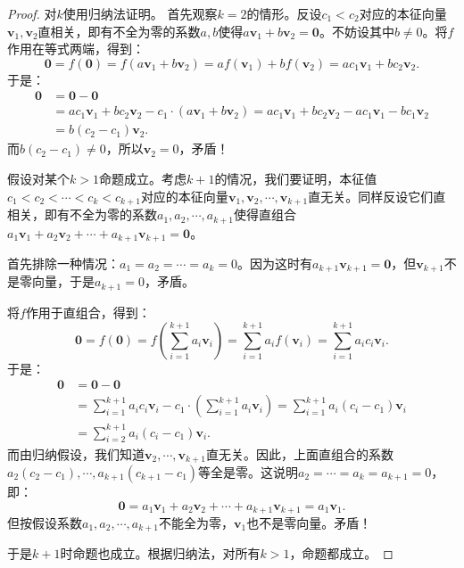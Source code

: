 \documentclass[12pt,UTF8,fontset=none]{ctexbook}
\begin{document}
\begin{proof}
    对$k$使用归纳法证明。
    首先观察$k=2$的情形。反设$c_1<c_2$对应的本征向量$\mathbf{v}_1,\mathbf{v}_2$直相关，即有不全为零的系数$a,b$使得$a\mathbf{v}_1+b\mathbf{v}_2=\mathbf{0}$。不妨设其中$b\neq 0$。将$f$作用在等式两端，得到：
    $$ \mathbf{0} = f(\mathbf{0}) = f(a\mathbf{v}_1+b\mathbf{v}_2) = af(\mathbf{v}_1)+bf(\mathbf{v}_2) = ac_1\mathbf{v}_1+bc_2\mathbf{v}_2.$$
    于是：
    \begin{align*}
        \mathbf{0} &= \mathbf{0} - \mathbf{0} \\
        &= ac_1\mathbf{v}_1+bc_2\mathbf{v}_2 - c_1\cdot(a\mathbf{v}_1+b\mathbf{v}_2) = ac_1\mathbf{v}_1+bc_2\mathbf{v}_2-ac_1\mathbf{v}_1-bc_1\mathbf{v}_2 \\
        &= b(c_2 - c_1)\mathbf{v}_2.
    \end{align*}
    而$b(c_2 - c_1)\neq 0$，所以$\mathbf{v}_2 = 0$，矛盾！

    假设对某个$k>1$命题成立。考虑$k+1$的情况，我们要证明，本征值$c_1<c_2<\cdots<c_k<c_{k+1}$对应的本征向量$\mathbf{v}_1,\mathbf{v}_2,\cdots,\mathbf{v}_{k+1}$直无关。同样反设它们直相关，即有不全为零的系数$a_1,a_2,\cdots,a_{k+1}$使得直组合$a_1\mathbf{v}_1+a_2\mathbf{v}_2+\cdots+a_{k+1}\mathbf{v}_{k+1}=\mathbf{0}$。
    
    首先排除一种情况：$a_1=a_2=\cdots=a_{k}=0$。因为这时有$a_{k+1}\mathbf{v}_{k+1}=\mathbf{0}$，但$\mathbf{v}_{k+1}$不是零向量，于是$a_{k+1}=0$，矛盾。
    
    将$f$作用于直组合，得到：
    $$ \mathbf{0} = f(\mathbf{0}) = f\left(\sum_{i=1}^{k+1} a_i \mathbf{v}_i\right) = \sum_{i=1}^{k+1} a_i f(\mathbf{v}_i) = \sum_{i=1}^{k+1} a_ic_i\mathbf{v}_i.$$
    于是：
    \begin{align*}
        \mathbf{0} &= \mathbf{0} - \mathbf{0} \\
        &= \sum_{i=1}^{k+1} a_ic_i\mathbf{v}_i - c_1\cdot\left( \sum_{i=1}^{k+1} a_i\mathbf{v} _i\right) = \sum_{i=1}^{k+1} a_i(c_i - c_1)\mathbf{v}_i \\
        &= \sum_{i=2}^{k+1} a_i(c_i - c_1)\mathbf{v}_i.
    \end{align*}
    而由归纳假设，我们知道$\mathbf{v}_2,\cdots,\mathbf{v}_{k+1}$直无关。因此，上面直组合的系数$a_2(c_2-c_1),\cdots,a_{k+1}(c_{k+1}-c_1)$等全是零。这说明$a_2=\cdots=a_k=a_{k+1}=0$，即：
    $$\mathbf{0} = a_1\mathbf{v}_1+a_2\mathbf{v}_2+\cdots+a_{k+1}\mathbf{v}_{k+1} = a_1\mathbf{v}_1.$$
    但按假设系数$a_1,a_2,\cdots,a_{k+1}$不能全为零，$\mathbf{v}_1$也不是零向量。矛盾！

    于是$k+1$时命题也成立。根据归纳法，对所有$k>1$，命题都成立。
\end{proof}
\end{document}
